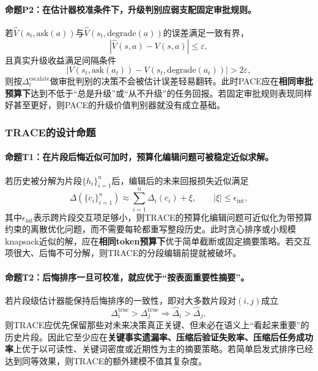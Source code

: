 \documentclass[12pt,a4paper]{article}
\begin{document}
\paragraph{命题P2：在估计器校准条件下，升级判别应弱支配固定审批规则。}
若$\hat{V}(s_t,\text{ask}(a))$与$\hat{V}(s_t,\text{degrade}(a))$的误差满足一致有界，
\begin{equation}
\left|\hat{V}(s,a)-V(s,a)\right|\le \varepsilon,
\end{equation}
且真实升级收益满足间隔条件
\begin{equation}
\left|V(s_t,\text{ask}(a_t))-V(s_t,\text{degrade}(a_t))\right| > 2\varepsilon,
\end{equation}
则按$\Delta_t^{\text{escalate}}$做审批判别的决策不会被估计误差轻易翻转。此时PACE应在\textbf{相同审批预算下}达到不低于“总是升级”或“从不升级”的任务回报。若固定审批规则表现同样好甚至更好，则PACE的升级价值判别器就没有成立基础。

\subsubsection{TRACE的设计命题}

\paragraph{命题T1：在片段后悔近似可加时，预算化编辑问题可被稳定近似求解。}
若历史被分解为片段$\{h_i\}_{i=1}^n$后，编辑后的未来回报损失近似满足
\begin{equation}
\Delta(\{c_i\}_{i=1}^n)\approx \sum_{i=1}^n \Delta_i(c_i) + \xi,
\qquad |\xi|\le \epsilon_{\text{int}},
\end{equation}
其中$\epsilon_{\text{int}}$表示跨片段交互项足够小，则TRACE的预算化编辑问题可近似化为带预算约束的离散优化问题，而不需要每轮都重写整段历史。此时贪心排序或小规模knapsack近似的解，应在\textbf{相同token预算下}优于简单截断或固定摘要策略。若交互项很大、后悔不可分解，则TRACE的分段编辑前提就被破坏。

\paragraph{命题T2：后悔排序一旦可校准，就应优于“按表面重要性摘要”。}
若片段级估计器能保持后悔排序的一致性，即对大多数片段对$(i,j)$成立
\begin{equation}
\Delta_i^{\text{true}} > \Delta_j^{\text{true}}
\Rightarrow
\hat{\Delta}_i > \hat{\Delta}_j,
\end{equation}
则TRACE应优先保留那些对未来决策真正关键、但未必在语义上“看起来重要”的历史片段。因此它至少应在\textbf{关键事实遗漏率、压缩后验证失败率、压缩后任务成功率}上优于以可读性、关键词密度或近期性为主的摘要策略。若简单启发式排序已经达到同等效果，则TRACE的额外建模不值其复杂度。
\end{document}
